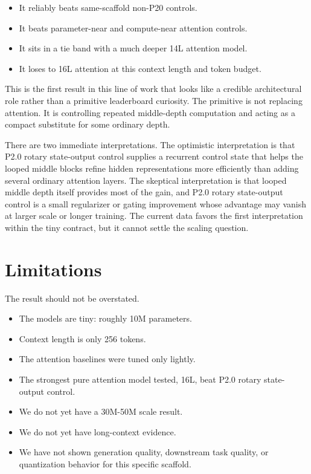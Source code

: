 \documentclass[11pt]{article}
\newcommand{\pshort}{P20}
\newcommand{\pcontrol}{P2.0 rotary state-output control}
\begin{document}
\begin{itemize}
  \item It reliably beats same-scaffold non-\pshort{} controls.
  \item It beats parameter-near and compute-near attention controls.
  \item It sits in a tie band with a much deeper 14L attention model.
  \item It loses to 16L attention at this context length and token budget.
\end{itemize}

This is the first result in this line of work that looks like a credible
architectural role rather than a primitive leaderboard curiosity. The primitive
is not replacing attention. It is controlling repeated middle-depth computation
and acting as a compact substitute for some ordinary depth.

There are two immediate interpretations. The optimistic interpretation is that
\pcontrol{} supplies a recurrent control state that helps the looped middle
blocks refine hidden representations more efficiently than adding several
ordinary attention layers. The skeptical interpretation is that looped middle
depth itself provides most of the gain, and \pcontrol{} is a small regularizer
or gating improvement whose advantage may vanish at larger scale or longer
training. The current data favors the first interpretation within the tiny
contract, but it cannot settle the scaling question.

\section{Limitations}

The result should not be overstated.

\begin{itemize}
  \item The models are tiny: roughly 10M parameters.
  \item Context length is only 256 tokens.
  \item The attention baselines were tuned only lightly.
  \item The strongest pure attention model tested, 16L, beat \pcontrol{}.
  \item We do not yet have a 30M-50M scale result.
  \item We do not yet have long-context evidence.
  \item We have not shown generation quality, downstream task quality, or
    quantization behavior for this specific scaffold.
\end{itemize}
\end{document}
